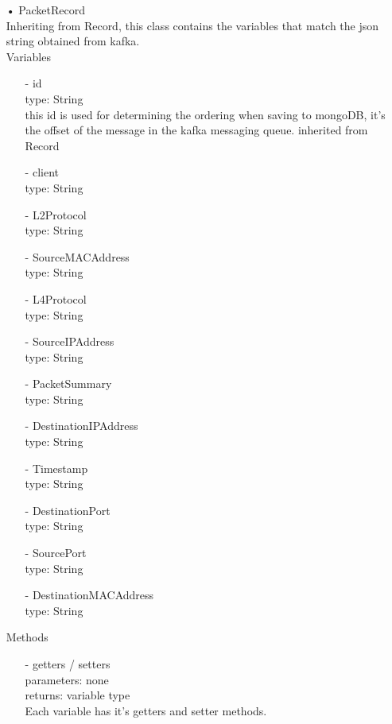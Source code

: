 \documentclass[twoside, english, draft]{design}
\begin{document}
\begin{itemize}
	\item[•]PacketRecord
	\\Inheriting from Record, this class contains the variables that match the json string obtained from kafka.
	\\Variables
	\begin{itemize}
			\item[-] id
			\\type: String
			\\this id is used for determining the ordering when saving to mongoDB, it's the offset of the message in the kafka messaging queue. inherited from Record
			\item[-] client
			\\type: String
			\item[-] L2Protocol
			\\type: String
			\item[-] SourceMACAddress
			\\type: String
			\item[-] L4Protocol
			\\type: String
			\item[-] SourceIPAddress
			\\type: String
			\item[-] PacketSummary
			\\type: String
			\item[-] DestinationIPAddress
			\\type: String
			\item[-] Timestamp
			\\type: String
			\item[-] DestinationPort
			\\type: String
			\item[-] SourcePort
			\\type: String
			\item[-] DestinationMACAddress
			\\type: String
			
	\end{itemize}
	
	Methods
	\begin{itemize}
			\item[-]getters / setters
			\\parameters: none
			\\returns: variable type
			\\Each variable has it's getters and setter methods.
	\end{itemize}
	

\end{itemize}
\end{document}
